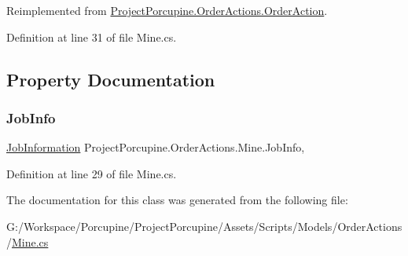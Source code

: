 Reimplemented from \hyperlink{class_project_porcupine_1_1_order_actions_1_1_order_action_afb48593caf6e46d965ac5182bcfe1c4b}{Project\+Porcupine.\+Order\+Actions.\+Order\+Action}.



Definition at line 31 of file Mine.\+cs.



\subsection{Property Documentation}
\mbox{\label{class_project_porcupine_1_1_order_actions_1_1_mine_acbd914eecee6b3f9cddfed409101cea0}} 
\subsubsection{\texorpdfstring{Job\+Info}{JobInfo}}
{\footnotesize\ttfamily \hyperlink{class_project_porcupine_1_1_order_actions_1_1_order_action_1_1_job_information}{Job\+Information} Project\+Porcupine.\+Order\+Actions.\+Mine.\+Job\+Info\hspace{0.3cm}{\ttfamily [get]}, {\ttfamily [set]}}



Definition at line 29 of file Mine.\+cs.



The documentation for this class was generated from the following file\+:\begin{DoxyCompactItemize}
\item 
G\+:/\+Workspace/\+Porcupine/\+Project\+Porcupine/\+Assets/\+Scripts/\+Models/\+Order\+Actions/\hyperlink{_mine_8cs}{Mine.\+cs}\end{DoxyCompactItemize}
